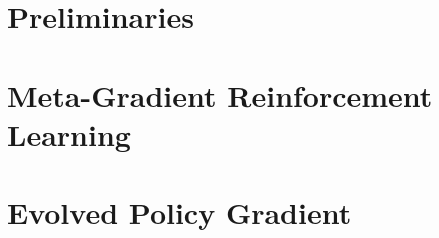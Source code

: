 \documentclass[conference]{IEEEtran}
\begin{document}
	
	
	
	
	\section{Preliminaries}
		
	\section{Meta-Gradient Reinforcement Learning}
		
	\section{Evolved Policy Gradient}
		
\end{document}
